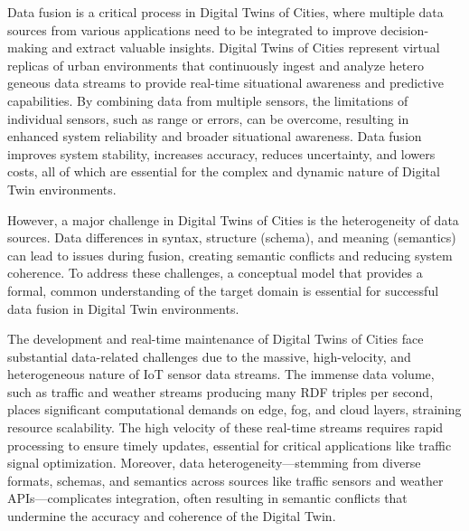 \documentclass[5p,times]{elsarticle}
\begin{document}
Data fusion is a critical process in Digital Twins of Cities,
where multiple data sources from various applications need to
be integrated to improve decision-making and extract valuable
insights. Digital Twins of Cities represent virtual replicas of
urban environments that continuously ingest and analyze hetero
geneous data streams to provide real-time situational awareness
and predictive capabilities. By combining data from multiple
sensors, the limitations of individual sensors, such as range or
errors, can be overcome, resulting in enhanced system reliability
and broader situational awareness. Data fusion improves system
stability, increases accuracy, reduces uncertainty, and lowers
costs, all of which are essential for the complex and dynamic
nature of Digital Twin environments.

However, a major challenge in Digital Twins of Cities is
the heterogeneity of data sources. Data differences in syntax,
structure (schema), and meaning (semantics) can lead to issues
during fusion, creating semantic conflicts and reducing system
coherence. To address these challenges, a conceptual model
that provides a formal, common understanding of the target
domain is essential for successful data fusion in Digital Twin
environments.

The development and real-time maintenance of Digital Twins
 of Cities face substantial data-related challenges due to the massive,
  high-velocity, and heterogeneous nature of IoT sensor data
 streams. The immense data volume, such as traffic and weather
 streams producing many RDF triples per second, places
 significant computational demands on edge, fog, and cloud layers, straining resource scalability. The high velocity of these
 real-time streams requires rapid processing to ensure timely
 updates, essential for critical applications like traffic signal optimization. Moreover, data heterogeneity—stemming from diverse formats, schemas, and semantics across sources like traffic
 sensors and weather APIs—complicates integration, often resulting in semantic conflicts that undermine the accuracy and
 coherence of the Digital Twin. 
 
\end{document}
